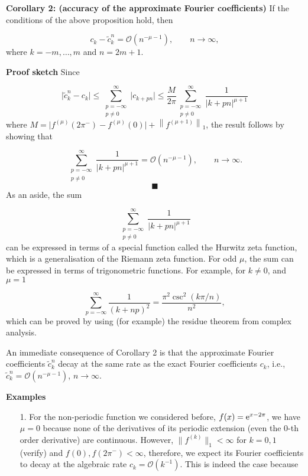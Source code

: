 \documentclass[12pt,landscape]{article}
\begin{document}
{\textbf{Corollary 2: (accuracy of the approximate Fourier coefficients)} If the conditions of the above proposition hold, then

\[
c_k - \tilde{c}^n_{k} = \mathcal{O}\left( n^{-\mu-1} \right), \qquad n \to \infty,
\]
where $k = -m, \ldots, m$ and $n = 2m + 1$.

\textbf{Proof sketch} Since

\[
\vert \tilde{c}^n_k - c_k \vert \leq  \sum_{\substack{p=-\infty\\ p\neq 0}}^{\infty} \vert c_{k+pn} \vert \leq  \frac{M}{2\pi} \sum_{\substack{p=-\infty\\ p\neq 0}}^{\infty}  \frac{1}{\vert k + pn \vert^{\mu+1}}
\]
where $M  = \vert f^{(\mu)}(2\pi^{-}) - f^{(\mu)}(0)   \vert + \left\|f^{(\mu+1)}   \right\|_1$,  the result follows by showing that

\[
\sum_{\substack{p=-\infty\\ p\neq 0}}^{\infty}  \frac{1}{\vert k + pn \vert^{\mu+1}} = \mathcal{O}(n^{-\mu-1}), \qquad n \to \infty.
\]
\[
\blacksquare
\]
As an aside, the sum 

\[
\sum_{\substack{p=-\infty\\ p\neq 0}}^{\infty}  \frac{1}{\vert k + pn \vert^{\mu+1}}
\]
can be expressed in terms of a special function called the Hurwitz zeta function, which is a generalisation of the Riemann zeta function.  For odd $\mu$, the sum can be expressed in terms of trigonometric functions.  For example, for $k \neq 0$, and $\mu = 1$

\[
    \sum_{p=-\infty}^{\infty} \frac{1}{(k+np)^2} = \frac{\pi^2\csc^2(k\pi/n) }{n^2},
\]
which can be proved by using (for example) the residue theorem from complex analysis.

An immediate consequence of Corollary 2 is that the approximate Fourier coefficients $\tilde{c}^n_k$ decay at the same rate as the exact Fourier coefficients $c_k$, i.e., $\tilde{c}^n_k = \mathcal{O}(n^{-\mu-1})$, $n \to \infty$.

\textbf{Examples}  

\begin{itemize}
\item[1. ] For the non-periodic function we considered before, $f(x) = {\rm e}^{x-2\pi}$, we have $\mu = 0$ because none of the derivatives of its periodic extension (even the $0$-th order derivative) are continuous.  However, $\| f^{(k)} \|_{1} < \infty$ for $k = 0, 1$ (verify) and $f(0), f(2\pi^{-}) < \infty$, therefore, we expect its Fourier coefficients to decay at the algebraic rate $c_k = \mathcal{O}(k^{-1})$. This is indeed the case because


\end{itemize}}
\end{document}
